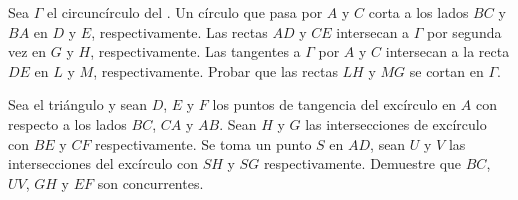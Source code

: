\begin{section-problem}
    Sea $\Gamma$ el circuncírculo del .
    Un círculo que pasa por $A$ y $C$ corta a los lados $BC$ y $BA$ en $D$ y $E$, respectivamente.
    Las rectas $AD$ y $CE$ intersecan a $\Gamma$ por segunda vez en $G$ y $H$, respectivamente.
    Las tangentes a $\Gamma$ por $A$ y $C$ intersecan a la recta $DE$ en $L$ y $M$, respectivamente.
    Probar que las rectas $LH$ y $MG$ se cortan en $\Gamma$.
\end{section-problem}

\begin{section-problem}
    Sea el triángulo  y sean $D$, $E$ y $F$ los puntos de tangencia del excírculo en $A$ con respecto a los lados $BC$, $CA$ y $AB$.
    Sean $H$ y $G$ las intersecciones de excírculo con $BE$ y $CF$ respectivamente.
    Se toma un punto $S$ en $AD$, sean $U$ y $V$ las intersecciones del excírculo con $SH$ y $SG$ respectivamente.
    Demuestre que $BC$, $UV$, $GH$ y $EF$ son concurrentes.
\end{section-problem}